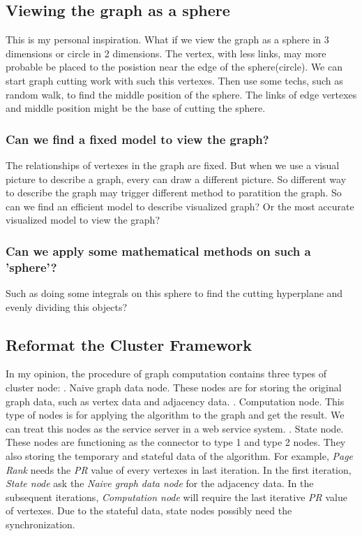 \documentclass{article}
\begin{document}
	\subsection{Viewing the graph as a sphere}
	This is my personal inspiration. What if we view the graph as a sphere in 3 dimensions or circle in 2 dimensions. The vertex, with less links, may more probable be placed to the posistion near the edge of the sphere(circle). We can start graph cutting work with such this vertexes. Then use some techs, such as random walk, to find the middle position of the sphere. The links of edge vertexes and middle position might be the base of cutting the sphere.
	\subsubsection{Can we find a fixed model to view the graph?}
	The relationships of vertexes in the graph are fixed. But when we use a visual picture to describe a graph, every can draw a different picture. So different way to describe the graph may trigger different method to paratition the graph. So can we find an efficient model to describe visualized graph? Or the most accurate visualized model to view the graph?
	\subsubsection{Can we apply some mathematical methods on such a 'sphere'?}
	Such as doing some integrals on this sphere to find the cutting hyperplane and evenly dividing this objects?

	\subsection{Reformat the Cluster Framework}
	In my opinion, the procedure of graph computation contains three types of cluster node:
	. Naive graph data node. These nodes are for storing the original graph data, such as vertex data and adjacency data.
	. Computation node. This type of nodes is for applying the algorithm to the graph and get the result. We can treat this nodes as the service server in a web service system.
	. State node. These nodes are functioning as the connector to type 1 and type 2 nodes. They also storing the temporary and stateful data of the algorithm. For example, \emph{Page Rank} needs the \emph{PR} value of every vertexes in last iteration. In the first iteration, \emph{State node} ask the \emph{Naive graph data node} for the adjacency data. In the subsequent iterations, \emph{Computation node} will require the last iterative \emph{PR} value of vertexes. Due to the stateful data, state nodes possibly need the synchronization.
	\newline
\end{document}
